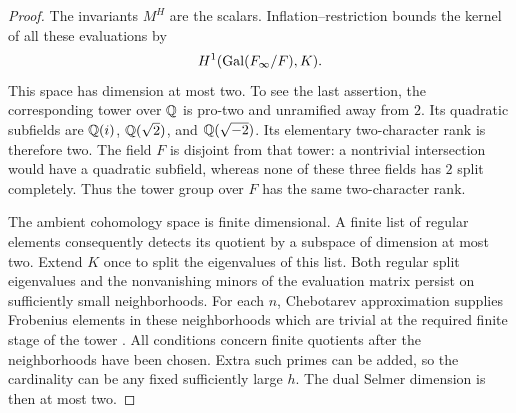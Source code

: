 \begin{proof}
The invariants $M^H$ are the scalars.  Inflation--restriction bounds
the kernel of all these evaluations by
\[
 H^1(\operatorname{Gal}(F_\infty/F),K).
\]
This space has dimension at most two.  To see the last assertion,
the corresponding tower over $\mathbb Q$ is pro-two and unramified away
from $2$.  Its quadratic subfields are
$\mathbb Q(i)$, $\mathbb Q(\sqrt2)$, and $\mathbb Q(\sqrt{-2})$.
Its elementary two-character rank is therefore two.
The field $F$ is disjoint from that tower: a nontrivial
intersection would have a quadratic subfield, whereas none of these
three fields has $2$ split completely.  Thus the tower group over
$F$ has the same two-character rank.

The ambient cohomology space is finite dimensional.  A finite list of
regular elements consequently detects its quotient by a subspace of
dimension at most two.  Extend $K$ once to split the eigenvalues of
this list.  Both regular split eigenvalues and the nonvanishing minors
of the evaluation matrix persist on sufficiently small neighborhoods.
For each $n$, Chebotarev approximation supplies Frobenius elements in
these neighborhoods which are trivial at the required finite stage
of the tower \cite[V, Theorem~3.23]{MilneCFT}.
All conditions concern finite quotients after the
neighborhoods have been chosen.  Extra such primes can be added, so
the cardinality can be any fixed sufficiently large $h$.  The dual
Selmer dimension is then at most two.


\end{proof}

